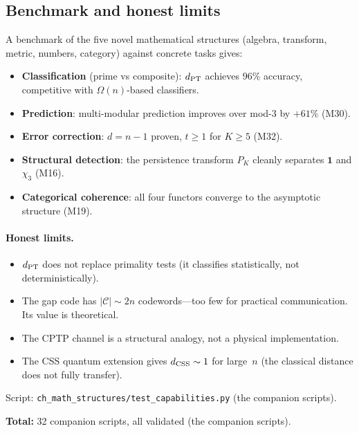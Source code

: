 \documentclass[12pt,a4paper]{article}
\begin{document}
\subsection{Benchmark and honest limits}
\label{sec:ms_benchmark}

A benchmark of the five novel mathematical structures (algebra,
transform, metric, numbers, category) against concrete tasks
gives:

\begin{itemize}[nosep]
\item \textbf{Classification} (prime vs composite): $d_{\rm PT}$
  achieves $96\%$ accuracy, competitive with $\Omega(n)$-based
  classifiers.
\item \textbf{Prediction}: multi-modular prediction improves over
  mod-3 by $+61\%$ (M30).
\item \textbf{Error correction}: $d = n-1$ proven, $t \geq 1$ for
  $K \geq 5$ (M32).
\item \textbf{Structural detection}: the persistence transform
  $P_K$ cleanly separates $\mathbf{1}$ and $\chi_3$ (M16).
\item \textbf{Categorical coherence}: all four functors converge
  to the asymptotic structure (M19).
\end{itemize}

\paragraph{Honest limits.}
\begin{itemize}[nosep]
\item $d_{\rm PT}$ does not replace primality tests (it classifies
  statistically, not deterministically).
\item The gap code has $|\mathcal{C}| \sim 2n$ codewords---too
  few for practical communication. Its value is theoretical.
\item The CPTP channel is a structural analogy, not a physical
  implementation.
\item The CSS quantum extension gives $d_{\rm CSS} \sim 1$ for
  large~$n$ (the classical distance does not fully transfer).
\end{itemize}

Script: \texttt{ch\_math\_structures/test\_capabilities.py} (the companion scripts).

\medskip
\noindent\textbf{Total:} 32 companion scripts, all validated (the companion scripts).
\end{document}
